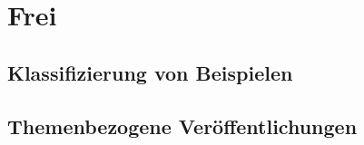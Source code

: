 \chapter{Frei}
\label{cha:frei}

\section{Klassifizierung von Beispielen}
\label{sec:klassifizierung}

\section{Themenbezogene Veröffentlichungen}
\label{sec:themenbezogene_veroeffentlichungen}